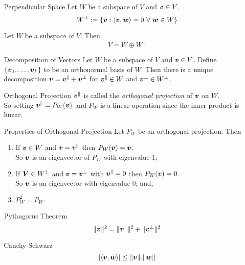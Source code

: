 \documentclass[11pt,a4paper]{article}
\begin{document}
\subtitle{Defintion 9.16 - }{Perpendicular Space}
Let $W$ be a subspace of $V$ and $\boldsymbol{v} \in V$.
$$W^{\bot} := \{\boldsymbol{v} : \langle \boldsymbol{v}, \boldsymbol{w} \rangle = 0\ \forall\ \boldsymbol{w} \in W\}$$

\subtitle{Theorem 9.17}{}
Let $W$ be a subspace of $V$. Then
$$V = W \oplus W^{\bot}$$

\subtitle{Proposition 9.17 - }{Decomposition of Vectors}
Let $W$ be a subspace of $V$ and $\boldsymbol{v} \in V$.
Define $\{\boldsymbol{v}_1, \dots , \boldsymbol{v}_k\}$ to be an orthonormal basis of $W$.
Then there is a unique decomposition $\boldsymbol{v} = \boldsymbol{v}^{\|} + \boldsymbol{v}^{\bot}$ for $\boldsymbol{v}^{\|} \in W$ and $\boldsymbol{v}^{\bot} \in W^{\bot}$.\\

\subtitle{Remark 9.18 - }{Orthogonal Projection}
$\boldsymbol{v}^{\|}$ is called the \textit{orthogonal projection} of $\boldsymbol{v}$ on $W$.\\
So setting $\boldsymbol{v}^{\|} = P_W(\boldsymbol{v})$ and $P_W$ is a linear operation since the inner product is linear.\\

\subtitle{Theorem 9.19 - }{Properties of Orthogonal Projection}
Let $P_W$ be an orthogonal projection. Then
\begin{enumerate}[label=\roman*)]
  \item If $\boldsymbol{v} \in W$ and $\boldsymbol{v} = \boldsymbol{v}^{\|}$ then $P_W(\boldsymbol{v}) = \boldsymbol{v}$.\\
  So $\boldsymbol{v}$ is an eigenvector of $P_W$ with eigenvalue $1$;
  \item If $\boldsymbol{V} \in W^{\bot}$ and $\boldsymbol{v} = \boldsymbol{v}^{\bot}$ with $\boldsymbol{v}^{\|} = 0$ then $P_W(\boldsymbol{v}) = 0$.\\
  So $\boldsymbol{v}$ is an eigenvector with eigenvalue 0; and,
  \item $P_W^2 = P_W$.
\end{enumerate}

\subtitle{Theorem 9.20 - }{Pythagorus Theorem}
$$\|\boldsymbol{v}\|^2 = \|\boldsymbol{v}^{\|}\|^2 + \|\boldsymbol{v}^{\bot}\|^2$$

\subtitle{Theorem 9.21 - }{Cauchy-Schwarz}
$$|\langle \boldsymbol{v}, \boldsymbol{w} \rangle | \leq \|\boldsymbol{v}\|.\|\boldsymbol{w}\|$$
\end{document}
